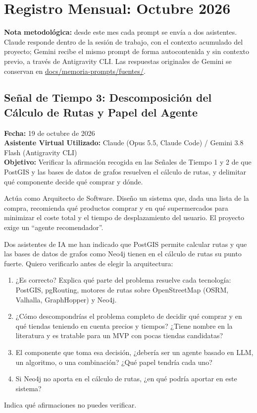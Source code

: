 \section{Registro Mensual: Octubre 2026}

\textbf{Nota metodológica:} desde este mes cada prompt se envía a dos asistentes. Claude responde dentro de la sesión de trabajo, con el contexto acumulado del proyecto; Gemini recibe el mismo prompt de forma autocontenida y sin contexto previo, a través de Antigravity CLI. Las respuestas originales de Gemini se conservan en \url{docs/memoria-prompts/fuentes/}.

\subsection{Señal de Tiempo 3: Descomposición del Cálculo de Rutas y Papel del Agente}
\textbf{Fecha:} 19 de octubre de 2026 \\
\textbf{Asistente Virtual Utilizado:} Claude (Opus 5.5, Claude Code) / Gemini 3.8 Flash (Antigravity CLI) \\
\textbf{Objetivo:} Verificar la afirmación recogida en las Señales de Tiempo 1 y 2 de que PostGIS y las bases de datos de grafos resuelven el cálculo de rutas, y delimitar qué componente decide qué comprar y dónde.

\begin{tcolorbox}[colback=promptcolor, title=Prompt Introducido, colframe=blue!50!black, breakable]
	Actúa como Arquitecto de Software. Diseño un sistema que, dada una lista de la compra, recomienda qué productos comprar y en qué supermercados para minimizar el coste total y el tiempo de desplazamiento del usuario. El proyecto exige un ``agente recomendador''.

	Dos asistentes de IA me han indicado que PostGIS permite calcular rutas y que las bases de datos de grafos como Neo4j tienen en el cálculo de rutas su punto fuerte. Quiero verificarlo antes de elegir la arquitectura:
	\begin{enumerate}
		\item ¿Es correcto? Explica qué parte del problema resuelve cada tecnología: PostGIS, pgRouting, motores de rutas sobre OpenStreetMap (OSRM, Valhalla, GraphHopper) y Neo4j.
		\item ¿Cómo descompondrías el problema completo de decidir qué comprar y en qué tiendas teniendo en cuenta precios y tiempos? ¿Tiene nombre en la literatura y es tratable para un MVP con pocas tiendas candidatas?
		\item El componente que toma esa decisión, ¿debería ser un agente basado en LLM, un algoritmo, o una combinación? ¿Qué papel tendría cada uno?
		\item Si Neo4j no aporta en el cálculo de rutas, ¿en qué podría aportar en este sistema?
	\end{enumerate}
	Indica qué afirmaciones no puedes verificar.
\end{tcolorbox}

